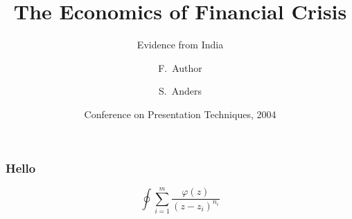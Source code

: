 \documentclass{beamer}
\begin{document}
\title[Crisis] %
{The Economics of Financial Crisis}
\subtitle{Evidence from India}
\author[Author, Anders] %
{F.~Author \and S.~Anders}
\date[KPT 2004] %
{Conference on Presentation Techniques, 2004}
\subject{Computer Science}
\frame{\titlepage}

\begin{frame}
  \frametitle{Hello}
  \[
    \oint\sum_{i=1}^m\frac{\varphi(z)}{(z-z_i)^{n_i}}
  \]
\end{frame}
\end{document}
